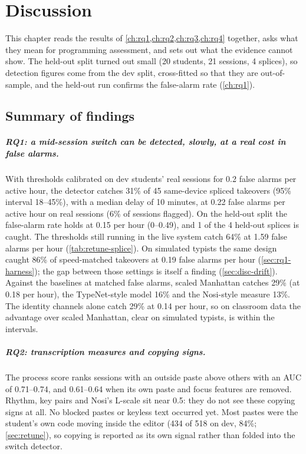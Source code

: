 \chapter{Discussion}
\label{ch:discussion}

This chapter reads the results of \cref{ch:rq1,ch:rq2,ch:rq3,ch:rq4} together,
asks what they mean for programming assessment, and sets out what the evidence
cannot show. The held-out split turned out small (20 students, 21 sessions, 4
splices), so detection figures come from the dev split, cross-fitted so that they
are out-of-sample, and the held-out run confirms the false-alarm rate
(\cref{ch:rq1}).

\section{Summary of findings}
\label{sec:disc-findings}

\paragraph{RQ1: a mid-session switch can be detected, slowly, at a real cost in
false alarms.} With thresholds calibrated on dev students' real sessions for 0.2
false alarms per active hour, the detector catches 31\% of 45 same-device spliced
takeovers (95\% interval 18--45\%), with a median delay of 10 minutes, at 0.22
false alarms per active hour on real sessions (6\% of sessions flagged). On the
held-out split the false-alarm rate holds at 0.15 per hour (0--0.49), and 1 of
the 4 held-out splices is caught. The thresholds still running in the live system
catch 64\% at 1.59 false alarms per hour (\cref{tab:retune-splice}). On simulated
typists the same design caught 86\% of speed-matched takeovers at 0.19 false
alarms per hour (\cref{sec:rq1-harness}); the gap between those settings is
itself a finding (\cref{sec:disc-drift}). Against the baselines at matched false
alarms, scaled Manhattan catches 29\% (at 0.18 per hour), the TypeNet-style model
16\% and the Nosi-style measure 13\%. The identity channels alone catch 29\% at
0.14 per hour, so on classroom data the advantage over scaled Manhattan, clear on
simulated typists, is within the intervals.

\paragraph{RQ2: transcription measures and copying signs.} The process score
ranks sessions with an outside paste above others with an AUC of 0.71--0.74, and
0.61--0.64 when its own paste and focus features are removed. Rhythm, key pairs
and Nosi's L-scale sit near 0.5: they do not see these copying signs at all. No
blocked pastes or keyless text occurred yet. Most pastes were the student's own
code moving inside the editor (434 of 518 on dev, 84\%; \cref{sec:retune}), so
copying is reported as its own signal rather than folded into the switch
detector.

